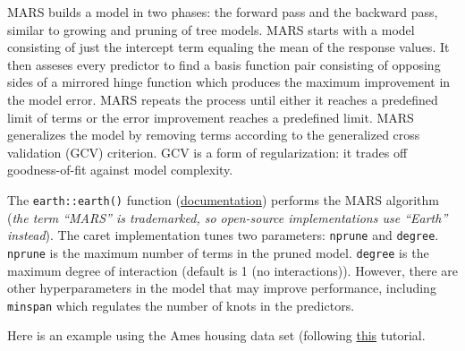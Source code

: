 \documentclass[]{book}
\begin{document}
MARS builds a model in two phases: the forward pass and the backward pass, similar to growing and pruning of tree models. MARS starts with a model consisting of just the intercept term equaling the mean of the response values. It then asseses every predictor to find a basis function pair consisting of opposing sides of a mirrored hinge function which produces the maximum improvement in the model error. MARS repeats the process until either it reaches a predefined limit of terms or the error improvement reaches a predefined limit. MARS generalizes the model by removing terms according to the generalized cross validation (GCV) criterion. GCV is a form of regularization: it trades off goodness-of-fit against model complexity.

The \texttt{earth::earth()} function (\href{https://www.rdocumentation.org/packages/earth/versions/5.1.2/topics/earth}{documentation}) performs the MARS algorithm (\emph{the term ``MARS'' is trademarked, so open-source implementations use ``Earth'' instead}). The caret implementation tunes two parameters: \texttt{nprune} and \texttt{degree}. \texttt{nprune} is the maximum number of terms in the pruned model. \texttt{degree} is the maximum degree of interaction (default is 1 (no interactions)). However, there are other hyperparameters in the model that may improve performance, including \texttt{minspan} which regulates the number of knots in the predictors.

Here is an example using the Ames housing data set (following \href{http://uc-r.github.io/mars}{this} tutorial.
\end{document}
